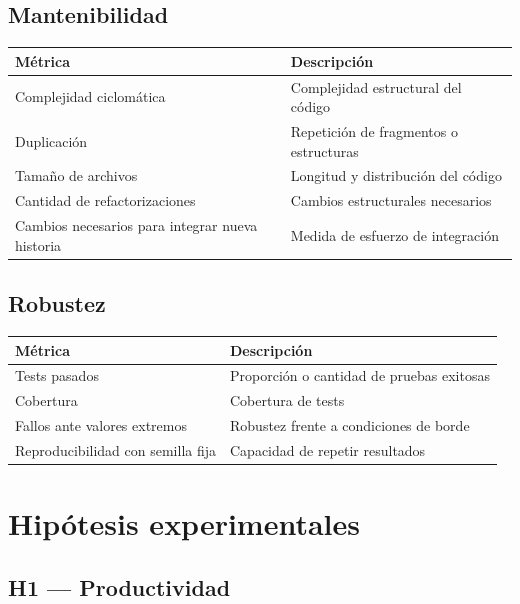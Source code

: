 \documentclass[11pt,a4paper]{article}
\begin{document}
\subsection{Mantenibilidad}

\begin{table}[h!]
\centering
\begin{tabular}{ll}
\toprule
\textbf{M\'etrica} & \textbf{Descripci\'on} \\
\midrule
Complejidad ciclom\'atica & Complejidad estructural del c\'odigo \\
Duplicaci\'on & Repetici\'on de fragmentos o estructuras \\
Tama\~no de archivos & Longitud y distribuci\'on del c\'odigo \\
Cantidad de refactorizaciones & Cambios estructurales necesarios \\
Cambios necesarios para integrar nueva historia & Medida de esfuerzo de integraci\'on \\
\bottomrule
\end{tabular}
\end{table}

\subsection{Robustez}

\begin{table}[h!]
\centering
\begin{tabular}{ll}
\toprule
\textbf{M\'etrica} & \textbf{Descripci\'on} \\
\midrule
Tests pasados & Proporci\'on o cantidad de pruebas exitosas \\
Cobertura & Cobertura de tests \\
Fallos ante valores extremos & Robustez frente a condiciones de borde \\
Reproducibilidad con semilla fija & Capacidad de repetir resultados \\
\bottomrule
\end{tabular}
\end{table}

\section{Hip\'otesis experimentales}

\subsection{H1 --- Productividad}
\end{document}
